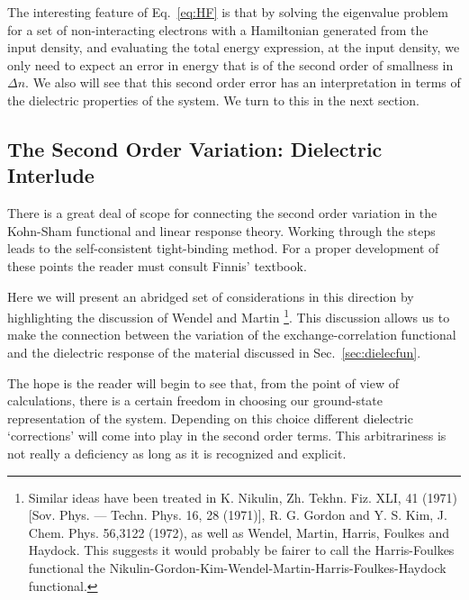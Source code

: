 The interesting feature of Eq.~\ref{eq:HF} is that by solving the eigenvalue problem
for a set of non-interacting electrons with a Hamiltonian generated from the 
input density, and evaluating the total energy expression,
at the input density, we only need to expect an error in energy that 
is of the second order of smallness in $\Delta n$. We also will see that 
this second order error has an interpretation in terms of the dielectric
properties of the system. We turn to this in the next section.

\subsection{The Second Order Variation: Dielectric Interlude}
There is a great deal of scope for connecting the second order variation in the Kohn-Sham functional
and linear response theory. Working through the steps leads to the self-consistent tight-binding method.
For a proper development of these points the reader must consult 
Finnis' textbook\cite{finnis}. 

Here we will present an abridged set of considerations in this direction by 
highlighting the discussion of Wendel and Martin\cite{wendel78}
\footnote{Similar ideas have been treated in 
K. Nikulin, Zh. Tekhn. Fiz. XLI, 41 (1971) [Sov. Phys. — Techn. Phys. 16, 28 (1971)], 
R. G. Gordon and Y. S. Kim, J. Chem. Phys. 56,3122 (1972),
as well as Wendel, Martin, Harris, Foulkes and Haydock. This suggests it would
probably be fairer to call the Harris-Foulkes functional the 
Nikulin-Gordon-Kim-Wendel-Martin-Harris-Foulkes-Haydock functional.}.
This discussion allows us to make the connection between the variation of the exchange-correlation functional and 
the dielectric response of the material discussed in Sec.~\ref{sec:dielecfun}. 

The hope is the reader will begin to see that, from the point of view of calculations, there is 
a certain freedom in choosing our ground-state representation of the system. Depending on this choice
different dielectric `corrections' will come into play in the second order terms. 
This arbitrariness is not really a deficiency as long as it is recognized and explicit. 

